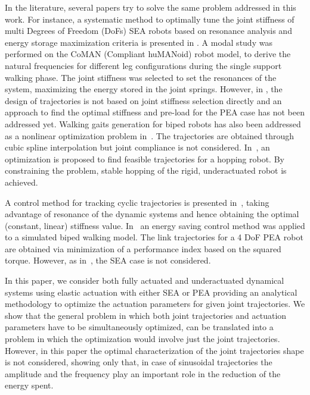 In the literature, several papers try to solve the same problem addressed in this work. 
For instance, a systematic method to optimally tune the joint stiffness of multi Degrees of Freedom (DoFs) SEA robots based on resonance analysis and energy storage maximization criteria is presented in \cite{Nikos13}. A modal study was performed on the CoMAN (Compliant huMANoid) robot model, to derive the natural frequencies for different leg configurations during the single support walking phase. The joint stiffness was selected to set the resonances of the system, 
maximizing the energy stored in the joint springs. 
However, in \cite{Nikos13}, the design of trajectories is not based on joint stiffness selection directly and an approach to find the optimal stiffness and pre-load for the PEA case has not been addressed yet. 
Walking gaits generation for biped robots has also been addressed as a nonlinear optimization problem in~\cite{Ott12}. The trajectories are obtained through cubic spline interpolation but joint compliance is not considered. In~\cite{Ting10}, an optimization is proposed to find feasible trajectories for a hopping robot. By constraining the problem, stable hopping of the rigid, underactuated robot is achieved.  

A control method for tracking cyclic trajectories is presented in~\cite{Kawamura09:2}, taking advantage of resonance of the dynamic systems and hence obtaining the optimal (constant, linear) stiffness value.  
In~\cite{Kawamura09:1} an energy saving control method was applied to a simulated biped walking model. The link trajectories for a 4 DoF PEA robot are obtained via minimization of a performance index based on the squared torque. However, as in~\cite{Kawamura09:2}, the SEA case is not considered. 

In this paper, we consider both fully actuated and underactuated dynamical systems using elastic actuation with either SEA or PEA providing an analytical methodology to optimize the actuation parameters for given joint trajectories. We show that the general problem in which both joint trajectories and actuation parameters have to be simultaneously optimized, can be translated into a problem in which the optimization would involve just the joint trajectories. However, in this paper the optimal characterization of the joint trajectories shape is not considered, showing only that, in case of sinusoidal trajectories the amplitude and the frequency play an important role in the reduction of the energy spent.


